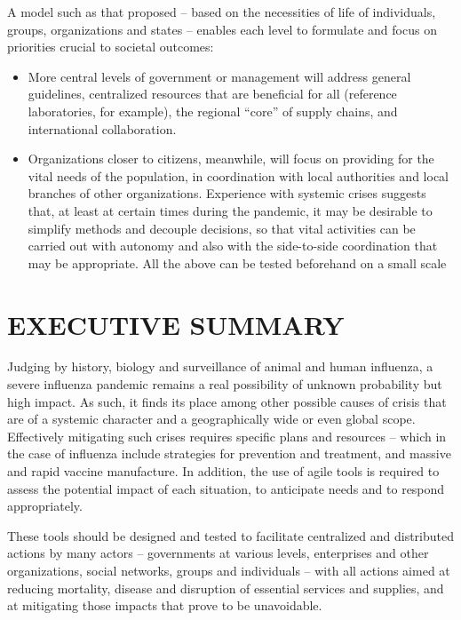 \documentclass[12pt, a4]{scrartcl}
\begin{document}
A model such as that proposed – based on the necessities of life of individuals, groups, organizations and states – enables each level to formulate and focus on priorities crucial to societal outcomes:
\begin{itemize}
	\item More central levels of government or management will address general guidelines, centralized resources that are beneficial for all (reference laboratories, for example), the regional “core” of supply chains, and international collaboration.
	\item Organizations closer to citizens, meanwhile, will focus on providing for the vital needs of the population, in coordination with local authorities and local branches of other organizations. Experience with systemic crises suggests that, at least at certain times during the pandemic, it may be desirable to simplify methods and decouple decisions, so that vital activities can be carried out with autonomy and also with the side-to-side coordination that may be appropriate. All the above can be tested beforehand on a small scale
\end{itemize}

\section{EXECUTIVE SUMMARY}
Judging by history, biology and surveillance of animal and human influenza, a severe influenza pandemic remains a real possibility of unknown probability but high impact. As such, it finds its place among other possible causes of crisis that are of a systemic character and a geographically wide or even global scope. Effectively mitigating such crises requires specific plans and resources – which in the case of influenza include strategies for prevention and treatment, and massive and rapid vaccine manufacture. In addition, the use of agile tools is required to assess the potential impact of each situation, to anticipate needs and to respond appropriately.

These tools should be designed and tested to facilitate centralized and distributed actions by many actors – governments at various levels, enterprises and other organizations, social networks, groups and individuals – with all actions aimed at reducing mortality, disease and disruption of essential services and supplies, and at mitigating those impacts that prove to be unavoidable. 
\end{document}
